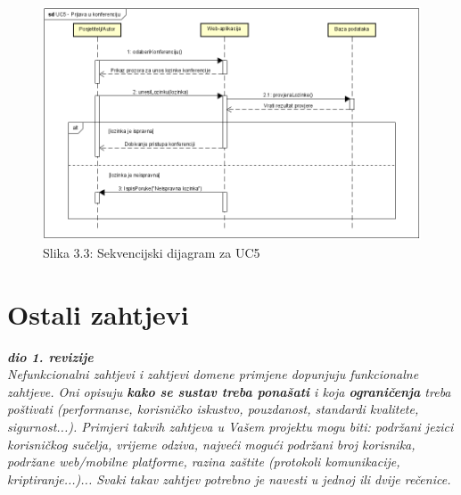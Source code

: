 		\begin{figure}[H]
			\includegraphics[scale=0.7]{slike/UC5.PNG} 
			\centering
			\caption{Slika 3.3: Sekvencijski dijagram za UC5}
			\label{fig:UC5}
		\end{figure}	
	
		\section{Ostali zahtjevi}
		
			\textbf{\textit{dio 1. revizije}}\\
		 
			 \textit{Nefunkcionalni zahtjevi i zahtjevi domene primjene dopunjuju funkcionalne zahtjeve. Oni opisuju \textbf{kako se sustav treba ponašati} i koja \textbf{ograničenja} treba poštivati (performanse, korisničko iskustvo, pouzdanost, standardi kvalitete, sigurnost...). Primjeri takvih zahtjeva u Vašem projektu mogu biti: podržani jezici korisničkog sučelja, vrijeme odziva, najveći mogući podržani broj korisnika, podržane web/mobilne platforme, razina zaštite (protokoli komunikacije, kriptiranje...)... Svaki takav zahtjev potrebno je navesti u jednoj ili dvije rečenice.}
			 
			 
			 
	